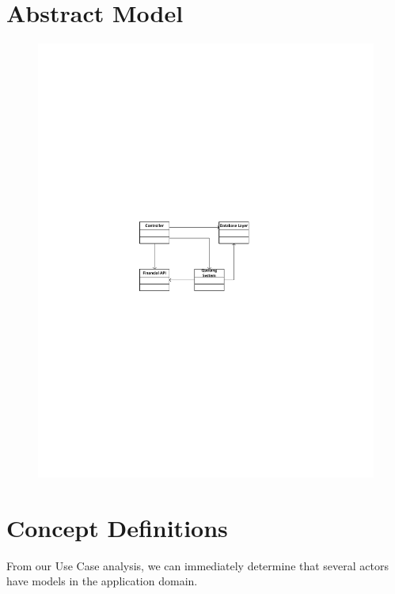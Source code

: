 \section{Abstract Model}
\begin{figure}
\centering
\includegraphics[width=5.5in]{./img/AbstractModel.pdf}
\caption{ }
\end{figure}

\section{Concept Definitions}

From our Use Case analysis, we can immediately determine that several
actors have models in the application domain.


